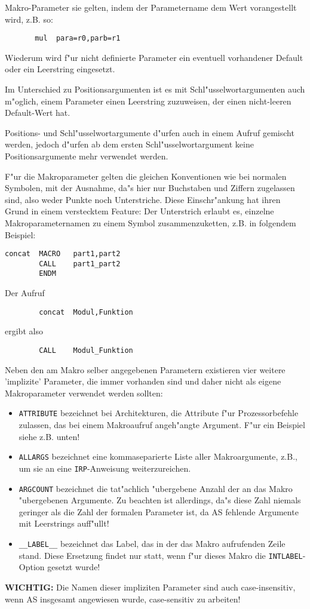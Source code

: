\documentclass[12pt,a4paper,twoside]{report}
\begin{document}
{Makro-Parameter sie gelten, indem der Parametername dem Wert
vorangestellt wird, z.B. so:
\begin{verbatim}
       mul  para=r0,parb=r1
\end{verbatim}
Wiederum wird f"ur nicht definierte Parameter ein eventuell
vorhandener Default oder ein Leerstring eingesetzt.
\par
Im Unterschied zu Positionsargumenten ist es mit
Schl"usselwortargumenten auch m"oglich, einem Parameter einen
Leerstring zuzuweisen, der einen nicht-leeren Default-Wert hat.
\par
Positions- und Schl"usselwortargumente d"urfen auch in einem
Aufruf gemischt werden, jedoch d"urfen ab dem ersten
Schl"usselwortargument keine Positionsargumente mehr verwendet
werden.
\par
F"ur die Makroparameter gelten die gleichen Konventionen wie bei
normalen Symbolen, mit der Ausnahme, da"s hier nur Buchstaben
und Ziffern zugelassen sind, also weder Punkte noch
Unterstriche. Diese Einschr"ankung hat ihren Grund in einem
verstecktem Feature: Der Unterstrich erlaubt es, einzelne
Makroparameternamen zu einem Symbol zusammenzuketten, z.B. in
folgendem Beispiel:
\begin{verbatim}
concat  MACRO   part1,part2
        CALL    part1_part2
        ENDM
\end{verbatim}
Der Aufruf
\begin{verbatim}
        concat  Modul,Funktion
\end{verbatim}
ergibt also
\begin{verbatim}
        CALL    Modul_Funktion
\end{verbatim}
\par
Neben den am Makro selber angegebenen Parametern existieren vier weitere
'implizite' Parameter, die immer vorhanden sind und daher nicht als eigene
Makroparameter verwendet werden sollten:
\begin{itemize}
\item{{\tt ATTRIBUTE} bezeichnet bei Architekturen, die Attribute f"ur
      Prozessorbefehle zulassen, das bei einem Makroaufruf angeh"angte
      Argument.  F"ur ein Beispiel siehe z.B. unten!}
\item{{\tt ALLARGS} bezeichnet eine kommaseparierte Liste aller
      Makroargumente, z.B., um sie an eine {\tt IRP}-Anweisung
      weiterzureichen.}
\item{{\tt ARGCOUNT} bezeichnet die tat"achlich "ubergebene Anzahl der
      an das Makro "ubergebenen Argumente.  Zu beachten ist allerdings,
      da"s diese Zahl niemals geringer als die Zahl der formalen Parameter
      ist, da AS fehlende Argumente mit Leerstrings auff"ullt!}
\item{{\tt \_\_LABEL\_\_} bezeichnet das Label, das in der das Makro aufrufenden
      Zeile stand.  Diese Ersetzung findet nur statt, wenn f"ur dieses
      Makro die {\tt INTLABEL}-Option gesetzt wurde!}
\end{itemize}
{\bf WICHTIG:} Die Namen dieser impliziten Parameter sind auch
case-insensitiv, wenn AS insgesamt angewiesen wurde, case-sensitiv
zu arbeiten!

}
\end{document}
